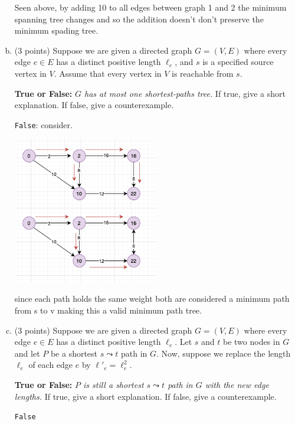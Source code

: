 \documentclass[12pt]{amsart}
\newcommand\TT[1]{\texttt{#1}}
\begin{document}
\begin{enumerate}[(a)]
Seen above, by adding 10 to all edges between graph 1 and 2 the minimum spanning tree changes and so the addition doesn't don't preserve the minimum spading tree.
\vfill

\newpage

\item (3 points) Suppose we are given a directed graph $G=(V,E)$ where every edge $e\in E$ has a distinct positive length $\ell_e$, and $s$ is a specified source vertex in $V$.  Assume that every vertex in $V$ is reachable from $s$.

{\bf True or False:} \emph{$G$ has at most one shortest-paths tree.}
If true, give a short explanation.
If false, give a counterexample.

\TT{False}: consider.
 \begin{center}
\includegraphics[width=0.5\textwidth]{QQ3.png}
\end{center}

since each path holds the same weight  both are considered a minimum path from s to v making this a valid minimum path tree. 


\vfill

\item (3 points) Suppose we are given a directed graph $G=(V,E)$ where every edge $e\in E$ has a distinct positive length $\ell_e$.
Let $s$ and $t$ be two nodes  in $G$ and let $P$ be a shortest $s \leadsto t$ path in $G$.
Now, suppose we replace the length $\ell_e$ of each edge $e$ by $\ell'_e = \ell_e^2$.

{\bf True or False:} \emph{$P$ is still a shortest $s \leadsto t$ path in $G$ with the new edge lengths.}
If true, give a short explanation.
If false, give a counterexample.

\vfill
\TT{False}


\end{enumerate}
\end{document}
